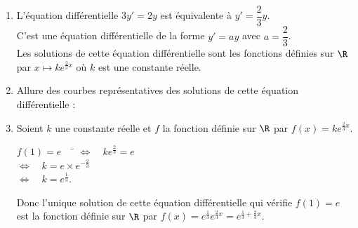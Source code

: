 \documentclass[a4paper,11pt,exos]{nsi} %
\begin{document}
\textcolor{UGLiBlue}{
    \begin{enumerate}
        \item L'équation différentielle $3y'=2y$ est équivalente à $y'=\dfrac{2}{3}y$.\\
        C'est une équation différentielle de la forme $y'=ay$ avec $a=\dfrac{2}{3}$.\\
        Les solutions de cette équation différentielle sont les fonctions définies sur $\R$ par $x\mapsto ke^{\frac{2}{3}x}$ où $k$ est une constante réelle.
        \item Allure des courbes représentatives des solutions de cette équation différentielle :
        \begin{center}
        \end{center}
        \item Soient $k$ une constante réelle et $f$ la fonction définie sur $\R$ par $f(x)=ke^{\frac{2}{3}x}$.
        \begin{tabbing}
            $f(1)=e\quad$ \= $\iff \quad ke^{\frac{2}{3}}=e$\\
            \> $\iff \quad k=e\times e^{-\frac{2}{3}}$\\
            \> $\iff \quad k=e^{\frac{1}{3}}$.
        \end{tabbing}
        Donc l'unique solution de cette équation différentielle qui vérifie $f(1)=e$ est la fonction définie sur $\R$ par $f(x)= e^{\frac{1}{3}}e^{\frac{2}{3}x}=e^{\frac{1}{3}+\frac{2}{3}x}$.
    \end{enumerate}
}
\end{document}
